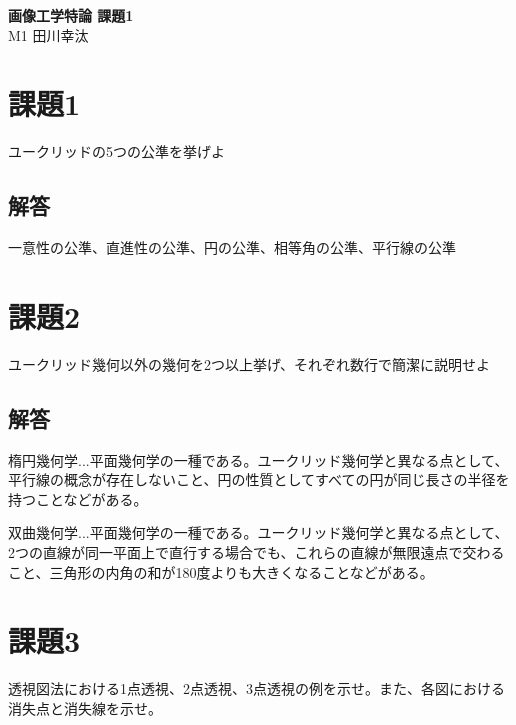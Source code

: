 \documentclass[]{jarticle}          %
\begin{document}

\vspace*{2ex}
\begin{center}
 {\Large \bf 画像工学特論 課題1}\\ %
 \vspace*{5mm}
 {\large M1 田川幸汰}%
\end{center}



\section{課題1}
ユークリッドの5つの公準を挙げよ
\subsection{解答}
一意性の公準、直進性の公準、円の公準、相等角の公準、平行線の公準

\section{課題2}
ユークリッド幾何以外の幾何を2つ以上挙げ、それぞれ数行で簡潔に説明せよ
\subsection{解答}
楕円幾何学...平面幾何学の一種である。ユークリッド幾何学と異なる点として、
平行線の概念が存在しないこと、円の性質としてすべての円が同じ長さの半径を持つことなどがある。

双曲幾何学...平面幾何学の一種である。ユークリッド幾何学と異なる点として、
2つの直線が同一平面上で直行する場合でも、これらの直線が無限遠点で交わること、三角形の内角の和が180度よりも大きくなることなどがある。

\newpage

\section{課題3}
透視図法における1点透視、2点透視、3点透視の例を示せ。また、各図における消失点と消失線を示せ。
\end{document}

